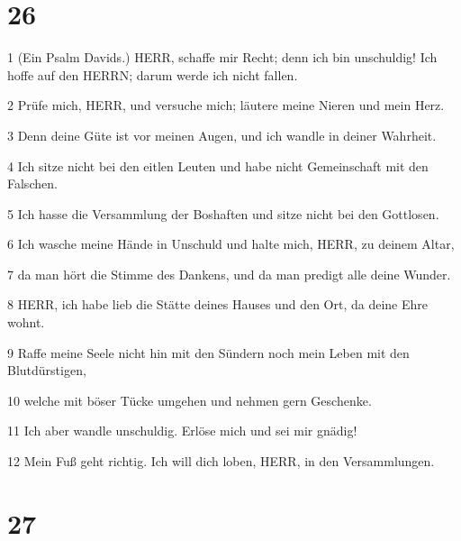 \chapter{26}

\par 1 (Ein Psalm Davids.) HERR, schaffe mir Recht; denn ich bin unschuldig! Ich hoffe auf den HERRN; darum werde ich nicht fallen.
\par 2 Prüfe mich, HERR, und versuche mich; läutere meine Nieren und mein Herz.
\par 3 Denn deine Güte ist vor meinen Augen, und ich wandle in deiner Wahrheit.
\par 4 Ich sitze nicht bei den eitlen Leuten und habe nicht Gemeinschaft mit den Falschen.
\par 5 Ich hasse die Versammlung der Boshaften und sitze nicht bei den Gottlosen.
\par 6 Ich wasche meine Hände in Unschuld und halte mich, HERR, zu deinem Altar,
\par 7 da man hört die Stimme des Dankens, und da man predigt alle deine Wunder.
\par 8 HERR, ich habe lieb die Stätte deines Hauses und den Ort, da deine Ehre wohnt.
\par 9 Raffe meine Seele nicht hin mit den Sündern noch mein Leben mit den Blutdürstigen,
\par 10 welche mit böser Tücke umgehen und nehmen gern Geschenke.
\par 11 Ich aber wandle unschuldig. Erlöse mich und sei mir gnädig!
\par 12 Mein Fuß geht richtig. Ich will dich loben, HERR, in den Versammlungen.

\chapter{27}

